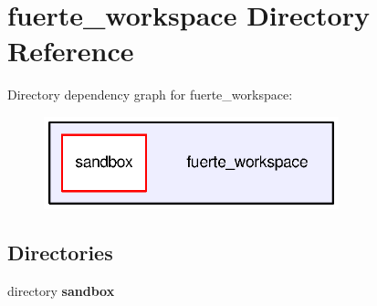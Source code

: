 \section{fuerte\-\_\-workspace Directory Reference}
\label{dir_d7495d9ca3b5b0c96bc16a28bd52c538}
Directory dependency graph for fuerte\-\_\-workspace\-:\nopagebreak
\begin{figure}[H]
\begin{center}
\leavevmode
\includegraphics[width=242pt]{dir_d7495d9ca3b5b0c96bc16a28bd52c538_dep}
\end{center}
\end{figure}
\subsection*{Directories}
\begin{DoxyCompactItemize}
\item 
directory {\bf sandbox}
\end{DoxyCompactItemize}
